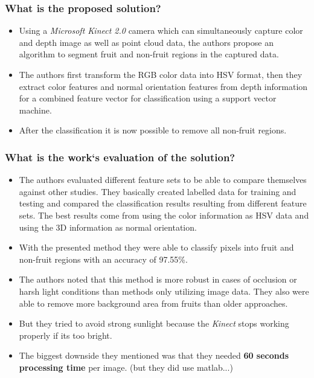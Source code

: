 \subsubsection*{What is the proposed solution?}
\begin{itemize}
    \item Using a \emph{Microsoft Kinect 2.0} camera which can simultaneously capture color and depth image as well as point cloud data, the authors propose an algorithm to segment fruit and non-fruit regions in the captured data.
    \item The authors first transform the RGB color data into HSV format, then they extract color features and normal orientation features from depth information for a combined feature vector for classification using a support vector machine.
    \item After the classification it is now possible to remove all non-fruit regions.
\end{itemize}
\subsubsection*{What is the work`s evaluation of the solution?}
\begin{itemize}
    \item The authors evaluated different feature sets to be able to compare themselves against other studies. They basically created labelled data for training and testing and compared the classification results resulting from different feature sets. The best results come from using the color information as HSV data and using the 3D information as normal orientation. 
    \item With the presented method they were able to classify pixels into fruit and non-fruit regions with an accuracy of 97.55\%. 
    \item The authors noted that this method is more robust in cases of occlusion or harsh light conditions than methods only utilizing image data. They also were able to remove more background area from fruits than older approaches.
    \item But they tried to avoid strong sunlight because the \emph{Kinect} stops working properly if its too bright.
    \item The biggest downside they mentioned was that they needed \textbf{60 seconds processing time} per image. (but they did use matlab...)
\end{itemize}
